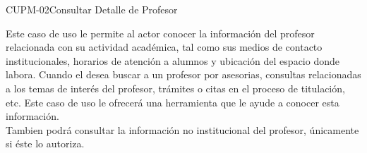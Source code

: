 \begin{UseCase}{CUPM-02}{Consultar Detalle de Profesor}
    {
	Este caso de uso le permite al actor conocer la información del profesor relacionada con su actividad académica, tal como sus medios de contacto institucionales, horarios de atención a alumnos y ubicación del espacio donde labora. 
	Cuando el  desea buscar a un profesor por asesorias, consultas relacionadas a los temas de interés del profesor, trámites o citas en el proceso de titulación, etc. Este caso de uso le ofrecerá una herramienta que le ayude a conocer esta información.\\
	
	Tambien podrá consultar la información no institucional del profesor, únicamente si éste lo autoriza.
	
    }


%			


\end{UseCase}
